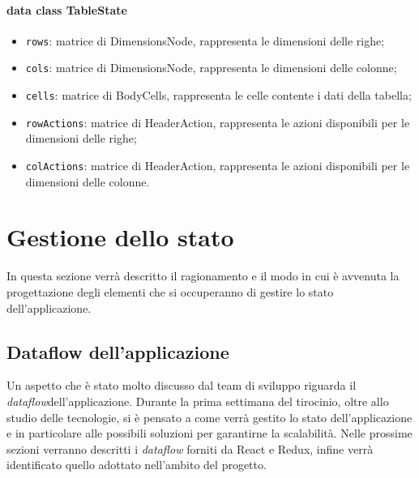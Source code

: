 \paragraph*{data class TableState}
\begin{itemize}
	\item \verb|rows|: matrice di DimensionsNode, rappresenta le dimensioni delle righe;
	\item \verb|cols|: matrice di DimensionsNode, rappresenta le dimensioni delle colonne;
	\item \verb|cells|: matrice di BodyCells, rappresenta le celle contente i dati della tabella;
	\item \verb|rowActions|: matrice di HeaderAction, rappresenta le azioni disponibili per le dimensioni delle righe;
	\item \verb|colActions|:  matrice di HeaderAction, rappresenta le azioni disponibili per le dimensioni delle colonne.
\end{itemize}

\section{Gestione dello stato}
In questa sezione verrà descritto il ragionamento e il modo in cui è avvenuta la progettazione degli elementi che si occuperanno di gestire lo stato dell'applicazione.

\subsection{Dataflow dell'applicazione}
Un aspetto che è stato molto discusso dal team di sviluppo riguarda il \emph{dataflow}\glosp dell'applicazione. Durante la prima settimana del tirocinio, oltre allo studio delle tecnologie, si è pensato a come verrà gestito lo stato dell'applicazione e in particolare alle possibili soluzioni per garantirne la scalabilità. Nelle prossime sezioni verranno descritti i \emph{dataflow} forniti da React e Redux, infine verrà identificato quello adottato nell'ambito del progetto.

